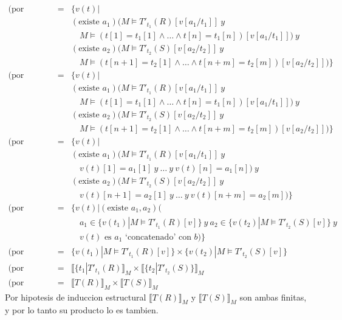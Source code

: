 \documentclass[a4paper]{article}
\newcommand{\existe}{\mbox{existe }}
\begin{document}
			\begin{eqnarray*}				
			\mbox{(por semantica)} & = & \{v(t)| \\
				&& (\existe a_1)(M \models T'_{t_1}(R)[v[a_1/t_1]]  \ y \\ 
				&& \quad M \models (t[1]=t_1[1] \wedge \ldots \wedge t[n]=t_1[n])[v[a_1/t_1]] ) \ y \ \\
				&& (\existe a_2)(M \models T'_{t_2}(S)[v[a_2/t_2]]  \ y \\ 
				&& \quad M \models (t[n+1]=t_2[1] \wedge \ldots \wedge t[n+m]=t_2[m])[v[a_2/t_2]] )\} \\
			\mbox{(por semantica)} & = & \{v(t)| \\
				&& (\existe a_1)(M \models T'_{t_1}(R)[v[a_1/t_1]]  \ y \\ 
				&& \quad M \models (t[1]=t_1[1] \wedge \ldots \wedge t[n]=t_1[n])[v[a_1/t_1]] ) \ y \ \\
				&& (\existe a_2)(M \models T'_{t_2}(S)[v[a_2/t_2]]  \ y \\ 
				&& \quad M \models (t[n+1]=t_2[1] \wedge \ldots \wedge t[n+m]=t_2[m])[v[a_2/t_2]] )\} \\
			\mbox{(por semantica)} & = & \{v(t)| \\
				&& (\existe a_1)(M \models T'_{t_1}(R)[v[a_1/t_1]]  \ y \\ 
				&& \quad v(t)[1]=a_1[1] \ y \ \ldots \ y \ v(t)[n]=a_1[n]) \ y \ \\
				&& (\existe a_2)(M \models T'_{t_2}(S)[v[a_2/t_2]]  \ y \\ 
				&& \quad v(t)[n+1]=a_2[1] \ y \ \ldots \ y \ v(t)[n+m]=a_2[m])\}\\
			\mbox{(por propiedad)} & = & \{v(t)| (\existe a_1,a_2)( \\
				&& \quad a_1 \in \{v(t_1)|M \models T'_{t_1}(R)[v]\} \ y \ a_2 \in \{v(t_2)|M \models T'_{t_2}(S)[v]\} \ y \\
				&& \quad v(t) \mbox{ es } a_1 \mbox{ `concatenado' con } b)\}\\
			\mbox{(por conjuntos)} & = & \{v(t_1)|M \models T'_{t_1}(R)[v]\} \times \{v(t_2)|M \models T'_{t_2}(S)[v]\} \\
			\mbox{(por semantica)} & = & \llbracket \{t_1|T'_{t_1}(R)\rrbracket _M \times \llbracket \{t_2|T'_{t_2}(S)\}\rrbracket _M \\
			\mbox{(por traduccion)} & = & \llbracket T(R)\rrbracket _M \times \llbracket T(S)\rrbracket _M
		\end{eqnarray*}
		Por hipotesis de induccion estructural $\llbracket T(R)\rrbracket _M$ y $\llbracket T(S)\rrbracket _M$ son ambas finitas, y por lo tanto su producto lo es tambien.
\end{document}
